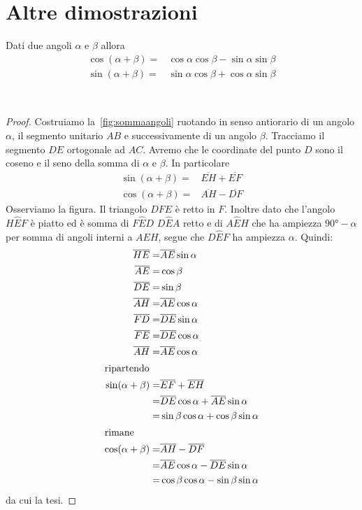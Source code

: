 \section{Altre dimostrazioni}
\begin{thm}\label{thm:Cosenosenosomma}
	Dati due angoli $\alpha$ e $\beta$ allora
	\begin{align*}
	\cos(\alpha+\beta)=&\cos\alpha\cos\beta-\sin\alpha\sin\beta \\
	\sin(\alpha+\beta)=&\sin\alpha\cos\beta+\cos\alpha\sin\beta 
	\end{align*}
\end{thm}~\cite{Brett2020}
\begin{proof}
	Costruiamo la~\vref{fig:sommaangoli} ruotando in senso antiorario di un angolo$\alpha$, il segmento unitario $AB$ e successivamente di un angolo $\beta$. Tracciamo il segmento $DE$ ortogonale ad $AC$. Avremo che le coordinate del punto $D$ sono il coseno e il seno  della somma  di $\alpha$ e $\beta$.  In particolare 
	\begin{align*}
	\sin(\alpha+\beta)=&\overline{EH}+\overline{EF}\\
	\cos(\alpha+\beta)=&\overline{AH}-\overline{DF}
	\end{align*}
	Osserviamo la figura. Il triangolo $DFE$ è retto in $F$. Inoltre dato che l'angolo $H\hat{E}F$ è piatto ed è somma di $F\hat{E}D$ $D\hat{E}A$ retto e di $A\hat{E}H$ che ha ampiezza  $\ang{90;;}-\alpha$ per somma di angoli interni a $AEH$, segue che $D\hat{E}F$ ha ampiezza $\alpha$. Quindi:
	\begin{align*}
	\overline{HE}=&\overline{AE}\sin\alpha\\
	\overline{AE}=&\cos\beta\\
	\overline{DE}=&\sin\beta\\
	\overline{AH}=&\overline{AE}\cos\alpha\\
	\overline{FD}=&\overline{DE}\sin\alpha\\
	\overline{FE}=&\overline{DE}\cos\alpha\\
	\overline{AH}=&\overline{AE}\cos\alpha\\
	\intertext{ripartendo}
	\sin(\alpha+\beta)=&\overline{EF}+\overline{EH}\\
	=&\overline{DE}\cos\alpha+\overline{AE}\sin\alpha\\
	=&\sin\beta\cos\alpha+\cos\beta\sin\alpha\\
	\intertext{rimane}
	\cos(\alpha+\beta)=&\overline{AH}-\overline{DF}\\
	=&\overline{AE}\cos\alpha-\overline{DE}\sin\alpha\\
	=&\cos\beta\cos\alpha-\sin\beta\sin\alpha\\
	\end{align*}
	da cui la tesi.
\end{proof}
